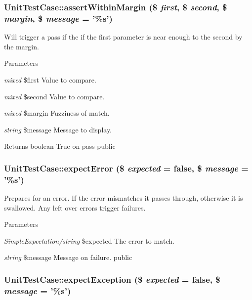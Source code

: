 \hypertarget{class_unit_test_case_a60e3a3a68cd4edfedcf2a2a96d68549a}{
\subsubsection[{assertWithinMargin}]{\setlength{\rightskip}{0pt plus 5cm}UnitTestCase::assertWithinMargin (\$ {\em first}, \/  \$ {\em second}, \/  \$ {\em margin}, \/  \$ {\em message} = {\ttfamily '\%s'})}}
\label{class_unit_test_case_a60e3a3a68cd4edfedcf2a2a96d68549a}
Will trigger a pass if the if the first parameter is near enough to the second by the margin. 
\begin{DoxyParams}{Parameters}
\item[{\em mixed}]\$first Value to compare. \item[{\em mixed}]\$second Value to compare. \item[{\em mixed}]\$margin Fuzziness of match. \item[{\em string}]\$message Message to display. \end{DoxyParams}
\begin{DoxyReturn}{Returns}
boolean True on pass  public 
\end{DoxyReturn}
\hypertarget{class_unit_test_case_aca84304870f9ce9c5b86fd1026e947dd}{
\subsubsection[{expectError}]{\setlength{\rightskip}{0pt plus 5cm}UnitTestCase::expectError (\$ {\em expected} = {\ttfamily false}, \/  \$ {\em message} = {\ttfamily '\%s'})}}
\label{class_unit_test_case_aca84304870f9ce9c5b86fd1026e947dd}
Prepares for an error. If the error mismatches it passes through, otherwise it is swallowed. Any left over errors trigger failures. 
\begin{DoxyParams}{Parameters}
\item[{\em SimpleExpectation/string}]\$expected The error to match. \item[{\em string}]\$message Message on failure.  public \end{DoxyParams}
\hypertarget{class_unit_test_case_a7653373ecf57e9badb0de44097a76fe3}{
\subsubsection[{expectException}]{\setlength{\rightskip}{0pt plus 5cm}UnitTestCase::expectException (\$ {\em expected} = {\ttfamily false}, \/  \$ {\em message} = {\ttfamily '\%s'})}}
